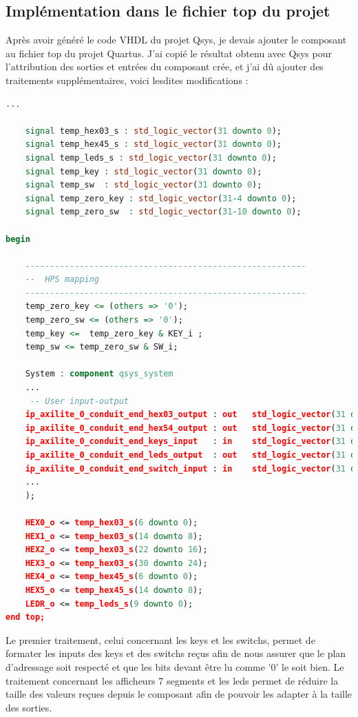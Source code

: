 \subsection{Implémentation dans le fichier top du projet}
Après avoir généré le code VHDL du projet Qsys, je devais ajouter le composant au fichier top du projet Quartus. J'ai copié le résultat obtenu avec Qsys pour l'attribution des sorties et entrées du composant crée, et j'ai dû ajouter des traitements supplémentaires, voici lesdites modifications : \\
\begin{lstlisting}[language=VHDL]
 ...
 
	signal temp_hex03_s : std_logic_vector(31 downto 0);
	signal temp_hex45_s : std_logic_vector(31 downto 0);
	signal temp_leds_s : std_logic_vector(31 downto 0);
	signal temp_key : std_logic_vector(31 downto 0);
	signal temp_sw  : std_logic_vector(31 downto 0);
	signal temp_zero_key : std_logic_vector(31-4 downto 0);
	signal temp_zero_sw  : std_logic_vector(31-10 downto 0);

begin

	---------------------------------------------------------
	--  HPS mapping
	---------------------------------------------------------
	temp_zero_key <= (others => '0');
	temp_zero_sw <= (others => '0');
	temp_key <=  temp_zero_key & KEY_i ;
	temp_sw <= temp_zero_sw & SW_i;

	System : component qsys_system
	...
	 -- User input-output
	ip_axilite_0_conduit_end_hex03_output : out   std_logic_vector(31 downto 0);                    -- hex03_output
	ip_axilite_0_conduit_end_hex54_output : out   std_logic_vector(31 downto 0);                    -- hex54_output
	ip_axilite_0_conduit_end_keys_input   : in    std_logic_vector(31 downto 0) := (others => 'X'); -- keys_input
	ip_axilite_0_conduit_end_leds_output  : out   std_logic_vector(31 downto 0);                    -- leds_output
	ip_axilite_0_conduit_end_switch_input : in    std_logic_vector(31 downto 0) := (others => 'X'); -- switch_input
	...
	);

	HEX0_o <= temp_hex03_s(6 downto 0);
	HEX1_o <= temp_hex03_s(14 downto 8);
	HEX2_o <= temp_hex03_s(22 downto 16);
	HEX3_o <= temp_hex03_s(30 downto 24);
	HEX4_o <= temp_hex45_s(6 downto 0);
	HEX5_o <= temp_hex45_s(14 downto 8);
	LEDR_o <= temp_leds_s(9 downto 0);
end top;

\end{lstlisting}

Le premier traitement, celui concernant les keys et les switchs, permet de formater les inputs des keys et des switchs reçus afin de nous assurer que le plan d'adressage soit respecté et que les bits devant être lu comme '0' le soit bien. Le traitement concernant les afficheurs 7 segments et les leds permet de réduire la taille des valeurs reçues depuis le composant afin de pouvoir les adapter à la taille des sorties.

